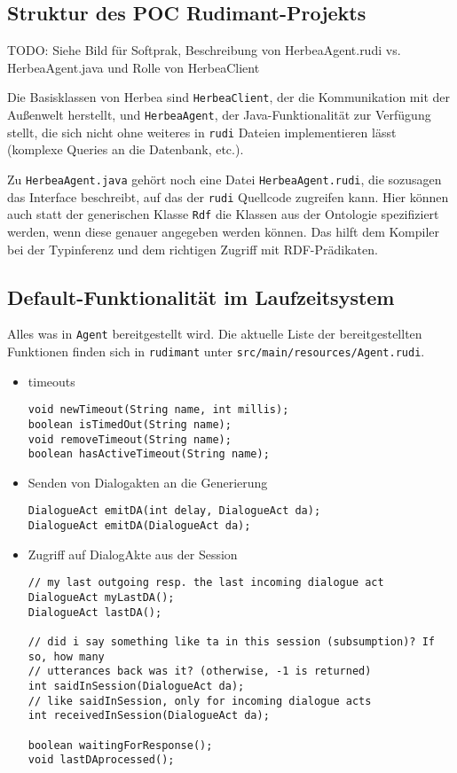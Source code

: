 \subsection{Struktur des POC Rudimant-Projekts}

TODO: Siehe Bild für Softprak, Beschreibung von HerbeaAgent.rudi
vs. HerbeaAgent.java und Rolle von HerbeaClient

Die Basisklassen von Herbea sind \texttt{HerbeaClient}, der die Kommunikation
mit der Außenwelt herstellt, und \texttt{HerbeaAgent}, der Java-Funktionalität
zur Verfügung stellt, die sich nicht ohne weiteres in \texttt{rudi} Dateien
implementieren lässt (komplexe Queries an die Datenbank, etc.).

Zu \texttt{HerbeaAgent.java} gehört noch eine Datei \texttt{HerbeaAgent.rudi},
die sozusagen das Interface beschreibt, auf das der \texttt{rudi} Quellcode
zugreifen kann. Hier können auch statt der generischen Klasse \texttt{Rdf} die
Klassen aus der Ontologie spezifiziert werden, wenn diese genauer angegeben
werden können. Das hilft dem Kompiler bei der Typinferenz und dem richtigen
Zugriff mit RDF-Prädikaten.

\subsection{Default-Funktionalität im Laufzeitsystem}
Alles was in \texttt{Agent} bereitgestellt wird. Die aktuelle Liste der
bereitgestellten Funktionen finden sich in \texttt{rudimant} unter
\texttt{src/main/resources/Agent.rudi}.

\begin{itemize}
\item timeouts
\begin{verbatim}
void newTimeout(String name, int millis);
boolean isTimedOut(String name);
void removeTimeout(String name);
boolean hasActiveTimeout(String name);
\end{verbatim}
\item Senden von Dialogakten an die Generierung
\begin{verbatim}
DialogueAct emitDA(int delay, DialogueAct da);
DialogueAct emitDA(DialogueAct da);
\end{verbatim}
\item Zugriff auf DialogAkte aus der Session
\begin{verbatim}
// my last outgoing resp. the last incoming dialogue act
DialogueAct myLastDA();
DialogueAct lastDA();

// did i say something like ta in this session (subsumption)? If so, how many
// utterances back was it? (otherwise, -1 is returned)
int saidInSession(DialogueAct da);
// like saidInSession, only for incoming dialogue acts
int receivedInSession(DialogueAct da);

boolean waitingForResponse();
void lastDAprocessed();
\end{verbatim}
\end{itemize}

